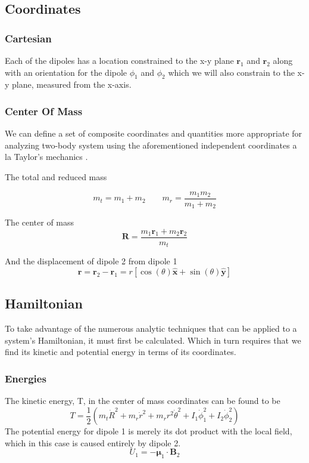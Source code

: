 \documentclass[prbg,preprint]{revtex4-1}
\begin{document}
\subsection{Coordinates}
\subsubsection{Cartesian}

Each of the dipoles has a location constrained to the x-y plane $\boldsymbol r_1$ and $\boldsymbol r_2$ along with an orientation for the dipole $\phi_1$ and $\phi_2$ which we will also constrain to the x-y plane, measured from the x-axis.
\subsubsection{Center Of Mass}
We can define a set of composite coordinates and quantities more appropriate for analyzing two-body system using the aforementioned independent coordinates a la Taylor's mechanics \cite{taylor2005classical}. 

The total and reduced mass

\begin{equation}
m_t = m_1+m_2
\qquad
m_r = \frac{m_1m_2}{m_1+m_2}
\end{equation}

The center of mass 
\begin{equation}
\boldsymbol R = \frac{m_1 \boldsymbol r_1+m_2 \boldsymbol r_2}{m_t}
\end{equation}

And the displacement of dipole 2 from dipole 1
\begin{equation}
\boldsymbol r 
=  \boldsymbol r_2-\boldsymbol r_1 
= r [\cos(\theta) \hat {\boldsymbol x}+\sin(\theta) \hat {\boldsymbol y}]
\end{equation}


\subsection{Hamiltonian}
To take advantage of the numerous analytic techniques that can be applied to a system's Hamiltonian, it must first be calculated. Which in turn requires that we find its kinetic and potential energy in terms of its coordinates.
\subsubsection{Energies}
The kinetic energy, T, in the center of mass coordinates can be found to be
\begin{equation}
T = \frac{1}{2}(
	m_t \dot R^2
	+m_r \dot r^2
	+m_r r^2 \dot \theta^2
	+ I_1 \dot \phi_1^2
	+ I_2 \dot \phi_2^2
)
\end{equation}
The potential energy for dipole 1 is merely its dot product with the local field, which in this case is caused entirely by dipole 2.
\begin{equation}
U_1 = -\boldsymbol \mu_1 \cdot \boldsymbol B_2
\end{equation}
\end{document}
